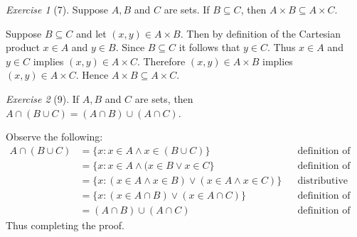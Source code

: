 \documentclass[12pt]{amsart}
\makeatletter
\theoremstyle{remark}
\newtheorem*{exercise}{Exercise}%
\renewenvironment{proof}[1][\proofname]{\par\doublespacing
  \pushQED{\qed}%
  \normalfont \topsep6\p@\@plus6\p@\relax
  \list{}{%
    \settowidth{\leftmargin}{\itshape\proofname:\hskip\labelsep}%
    \setlength{\labelwidth}{0pt}%
    \setlength{\itemindent}{-\leftmargin}%
  }%
  \item[\hskip\labelsep\itshape#1\@addpunct{:}]\ignorespaces
}{%
  \popQED\endlist\@endpefalse
  \singlespacing
}
\theoremstyle{mycomment}
\makeatother
\begin{document}
\begin{exercise}[7] Suppose $A,B$ and $C$ are sets. If $B\subseteq C$, then $A\times B\subseteq A\times C$.
\begin{proof}
Suppose $B \subseteq C$ and let $(x,y) \in A \times B$. Then by definition of the Cartesian product $x \in A$ and $y \in B$. Since $B \subseteq C$ it follows that $y \in C$. Thus $x \in A$ and $y \in C$ implies $(x,y) \in A \times C$. Therefore $(x,y) \in A \times B$ implies $(x,y) \in A \times C$. Hence $A \times B \subseteq A \times C$.
\end{proof}
\end{exercise}

\begin{exercise}[9] If $A,B$ and $C$ are sets, then $A\cap(B\cup C)=(A\cap B)\cup (A\cap C)$.
\begin{proof} Observe the following:
  \begin{align*}
    A \cap (B \cup C) & = \{x:x \in A \land x \in (B \cup C) \} && \text{definition of interesection}\\
                      & = \{x:x \in A \land (x \in B \lor x \in C\} && \text{definition of union} \\
                      & = \{x: (x \in A \land x\in B) \lor (x \in A \land x \in C)\} && \text{distributive law} \\
                      & = \{x: (x \in A \cap B) \lor (x \in A \cap C)\} && \text{definition of intersection} \\
                      & = (A \cap B) \cup (A \cap C) && \text{definition of union}
  \end{align*}
  Thus completing the proof.
\end{proof}
\end{exercise}
\end{document}
